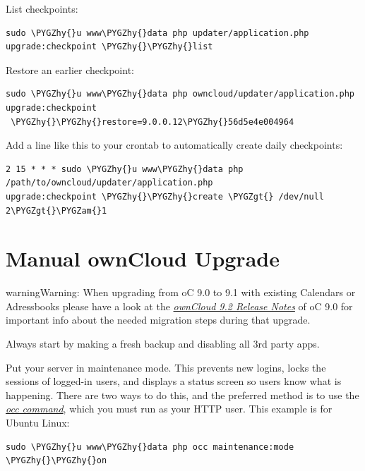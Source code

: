 \documentclass[letterpaper,10pt,english]{sphinxmanual}
\def\PYGZam{\char`\&}
\def\PYGZgt{\char`\>}
\def\PYGZhy{\char`\-}
\begin{document}
List checkpoints:

\begin{Verbatim}[commandchars=\\\{\}]
sudo \PYGZhy{}u www\PYGZhy{}data php updater/application.php upgrade:checkpoint \PYGZhy{}\PYGZhy{}list
\end{Verbatim}

Restore an earlier checkpoint:

\begin{Verbatim}[commandchars=\\\{\}]
sudo \PYGZhy{}u www\PYGZhy{}data php owncloud/updater/application.php upgrade:checkpoint
 \PYGZhy{}\PYGZhy{}restore=9.0.0.12\PYGZhy{}56d5e4e004964
\end{Verbatim}

Add a line like this to your crontab to automatically create daily
checkpoints:

\begin{Verbatim}[commandchars=\\\{\}]
2 15 * * * sudo \PYGZhy{}u www\PYGZhy{}data php /path/to/owncloud/updater/application.php
upgrade:checkpoint \PYGZhy{}\PYGZhy{}create \PYGZgt{} /dev/null 2\PYGZgt{}\PYGZam{}1
\end{Verbatim}


\section{Manual ownCloud Upgrade}
\label{maintenance/manual_upgrade:manual-owncloud-upgrade}\label{maintenance/manual_upgrade::doc}
\begin{notice}{warning}{Warning:}
When upgrading from oC 9.0 to 9.1 with existing Calendars or Adressbooks
please have a look at the {\hyperref[release_notes::doc]{\emph{ownCloud 9.2 Release Notes}}} of oC 9.0 for important info
about the needed migration steps during that upgrade.
\end{notice}

Always start by making a fresh backup and disabling all 3rd party apps.

Put your server in maintenance mode. This prevents new logins, locks the
sessions of logged-in users, and displays a status screen so users know what is
happening. There are two ways to do this, and the preferred method is to use the
{\hyperref[configuration_server/occ_command::doc]{\emph{occ command}}}, which you must run as
your HTTP user. This example is for Ubuntu Linux:

\begin{Verbatim}[commandchars=\\\{\}]
sudo \PYGZhy{}u www\PYGZhy{}data php occ maintenance:mode \PYGZhy{}\PYGZhy{}on
\end{Verbatim}
\end{document}
